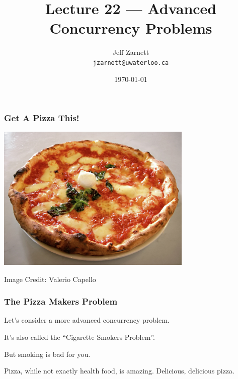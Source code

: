 

\title{Lecture 22 --- Advanced Concurrency Problems }

\author{Jeff Zarnett \\ \small \texttt{jzarnett@uwaterloo.ca}}
\date{\today}




\begin{frame}
	\titlepage

\end{frame}


\begin{frame}
	\frametitle{Get A Pizza This!}
	\begin{center}
		\includegraphics[width=0.7\textwidth]{images/pizza.jpg}
	\end{center}
	\hfill Image Credit: Valerio Capello

\end{frame}

\begin{frame}
	\frametitle{The Pizza Makers Problem}

	Let's consider a more advanced concurrency problem.

	It's also called the ``Cigarette Smokers Problem''.

	But smoking is bad for you.

	Pizza, while not exactly health food, is amazing. Delicious, delicious pizza.


\end{frame}


